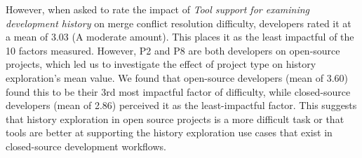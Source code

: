 
However, when asked to rate the impact of \textit{Tool support for examining development history} on merge conflict resolution difficulty, developers rated it at a mean of 3.03 (A moderate amount). This places it as the least impactful of the 10 factors measured. However, P2 and P8 are both developers on open-source projects, which led us to investigate the effect of project type on history exploration's mean value. We found that open-source developers (mean of 3.60) found this to be their 3rd most impactful factor of difficulty, while closed-source developers (mean of 2.86) perceived it as the least-impactful factor. This suggests that history exploration in open source projects is a more difficult task or that tools are better at supporting the history exploration use cases that exist in closed-source development workflows.

